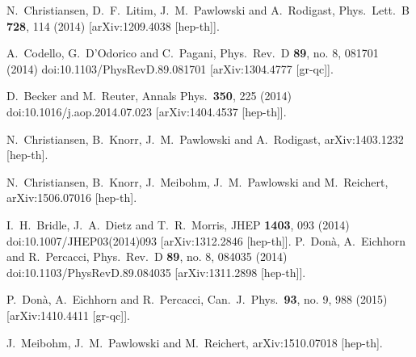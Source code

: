 \documentclass[twocolumn,prd,superscriptaddress,preprintnumbers,amsmath,amssymb,nofootinbib]{revtex4}
\begin{document}
\begin{thebibliography}{99}
  N.~Christiansen, D.~F.~Litim, J.~M.~Pawlowski and A.~Rodigast,
  Phys.\ Lett.\ B {\bf 728}, 114 (2014)
  [arXiv:1209.4038 [hep-th]].

  A.~Codello, G.~D'Odorico and C.~Pagani,
  Phys.\ Rev.\ D {\bf 89}, no. 8, 081701 (2014)
  doi:10.1103/PhysRevD.89.081701
  [arXiv:1304.4777 [gr-qc]].


  D.~Becker and M.~Reuter,
  Annals Phys.\  {\bf 350}, 225 (2014)
  doi:10.1016/j.aop.2014.07.023
  [arXiv:1404.4537 [hep-th]].
  
  N.~Christiansen, B.~Knorr, J.~M.~Pawlowski and A.~Rodigast,
  arXiv:1403.1232 [hep-th].
  
  N.~Christiansen, B.~Knorr, J.~Meibohm, J.~M.~Pawlowski and M.~Reichert,
  arXiv:1506.07016 [hep-th].
  
  I.~H.~Bridle, J.~A.~Dietz and T.~R.~Morris,
  JHEP {\bf 1403}, 093 (2014)
  doi:10.1007/JHEP03(2014)093
  [arXiv:1312.2846 [hep-th]].
  P.~Don\`a, A.~Eichhorn and R.~Percacci,
 Phys.\ Rev.\ D {\bf 89}, no. 8, 084035 (2014)
  doi:10.1103/PhysRevD.89.084035
  [arXiv:1311.2898 [hep-th]].
  
  P.~Don\`a, A.~Eichhorn and R.~Percacci,
  Can.\ J.\ Phys.\  {\bf 93}, no. 9, 988 (2015)
  [arXiv:1410.4411 [gr-qc]].

  J.~Meibohm, J.~M.~Pawlowski and M.~Reichert,
  arXiv:1510.07018 [hep-th].
 

\end{thebibliography}
\end{document}
